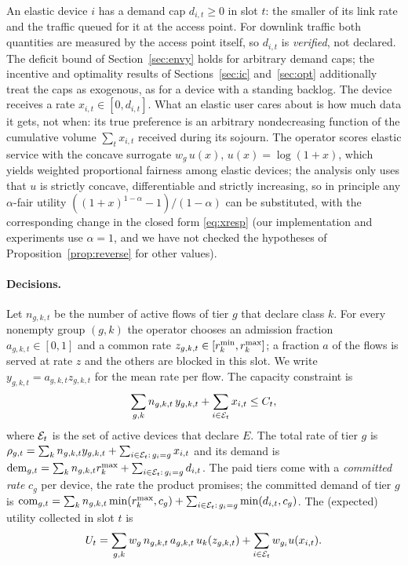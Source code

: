 An elastic device $i$ has a demand cap $d_{i,t}\ge 0$ in slot $t$: the smaller of its link rate and the traffic queued for it at the access point.
For downlink traffic both quantities are measured by the access point itself, so $d_{i,t}$ is \emph{verified}, not declared.
The deficit bound of Section~\ref{sec:envy} holds for arbitrary demand caps; the incentive and optimality results of Sections~\ref{sec:ic} and~\ref{sec:opt} additionally treat the caps as exogenous, as for a device with a standing backlog.
The device receives a rate $x_{i,t}\in[0,d_{i,t}]$.
What an elastic user cares about is how much data it gets, not when: its true preference is an arbitrary nondecreasing function of the cumulative volume $\sum_t x_{i,t}$ received during its sojourn.
The operator scores elastic service with the concave surrogate $w_g\,u(x)$, $u(x)=\log(1+x)$, which yields weighted proportional fairness among elastic devices; the analysis only uses that $u$ is strictly concave, differentiable and strictly increasing, so in principle any $\alpha$-fair utility $((1+x)^{1-\alpha}-1)/(1-\alpha)$ can be substituted, with the corresponding change in the closed form \eqref{eq:xresp} (our implementation and experiments use $\alpha=1$, and we have not checked the hypotheses of Proposition~\ref{prop:reverse} for other values).

\paragraph{Decisions.}
Let $n_{g,k,t}$ be the number of active flows of tier $g$ that declare class $k$.
For every nonempty group $(g,k)$ the operator chooses an admission fraction $a_{g,k,t}\in[0,1]$ and a common rate $z_{g,k,t}\in[r^{\min}_k,r^{\max}_k]$; a fraction $a$ of the flows is served at rate $z$ and the others are blocked in this slot.
We write $y_{g,k,t}=a_{g,k,t}z_{g,k,t}$ for the mean rate per flow.
The capacity constraint is
\begin{equation}\label{eq:cap}
\sum_{g,k} n_{g,k,t}\,y_{g,k,t}+\sum_{i\in\mathcal{E}_t}x_{i,t}\le C_t ,
\end{equation}
where $\mathcal{E}_t$ is the set of active devices that declare $E$.
The total rate of tier $g$ is $\rho_{g,t}=\sum_k n_{g,k,t}y_{g,k,t}+\sum_{i\in\mathcal{E}_t:\,g_i=g}x_{i,t}$ and its demand is $\mathrm{dem}_{g,t}=\sum_k n_{g,k,t}r^{\max}_k+\sum_{i\in\mathcal{E}_t:\,g_i=g}d_{i,t}$.
The paid tiers come with a \emph{committed rate} $c_g$ per device, the rate the product promises; the committed demand of tier $g$ is $\mathrm{com}_{g,t}=\sum_k n_{g,k,t}\min(r^{\max}_k,c_g)+\sum_{i\in\mathcal{E}_t:\,g_i=g}\min(d_{i,t},c_g)$.
The (expected) utility collected in slot $t$ is
\begin{equation}\label{eq:util}
U_t=\sum_{g,k}w_g\,n_{g,k,t}\,a_{g,k,t}\,u_k(z_{g,k,t})+\sum_{i\in\mathcal{E}_t}w_{g_i}u(x_{i,t}).
\end{equation}


